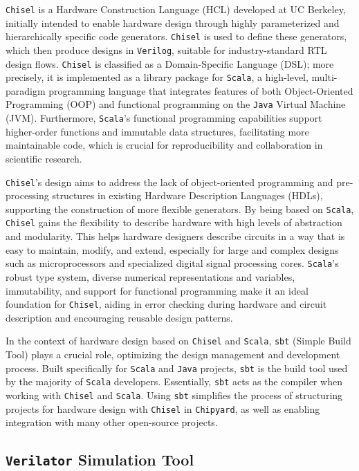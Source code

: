 \texttt{Chisel} is a Hardware Construction Language (HCL) developed at UC Berkeley, initially intended to enable hardware design through highly parameterized and hierarchically specific code generators. \texttt{Chisel} is used to define these generators, which then produce designs in \texttt{Verilog}, suitable for industry-standard RTL design flows. \texttt{Chisel} is classified as a Domain-Specific Language (DSL); more precisely, it is implemented as a library package for \texttt{Scala}, a high-level, multi-paradigm programming language that integrates features of both Object-Oriented Programming (OOP) and functional programming on the \texttt{Java} Virtual Machine (JVM). Furthermore, \texttt{Scala}'s functional programming capabilities support higher-order functions and immutable data structures, facilitating more maintainable code, which is crucial for reproducibility and collaboration in scientific research.

\texttt{Chisel}'s design aims to address the lack of object-oriented programming and pre-processing structures in existing Hardware Description Languages (HDLs), supporting the construction of more flexible generators. By being based on \texttt{Scala}, \texttt{Chisel} gains the flexibility to describe hardware with high levels of abstraction and modularity. This helps hardware designers describe circuits in a way that is easy to maintain, modify, and extend, especially for large and complex designs such as microprocessors and specialized digital signal processing cores. \texttt{Scala}'s robust type system, diverse numerical representations and variables, immutability, and support for functional programming make it an ideal foundation for \texttt{Chisel}, aiding in error checking during hardware and circuit description and encouraging reusable design patterns.

In the context of hardware design based on \texttt{Chisel} and \texttt{Scala}, \texttt{sbt} (Simple Build Tool) plays a crucial role, optimizing the design management and development process. Built specifically for \texttt{Scala} and \texttt{Java} projects, \texttt{sbt} is the build tool used by the majority of \texttt{Scala} developers. Essentially, \texttt{sbt} acts as the compiler when working with \texttt{Chisel} and \texttt{Scala}. Using \texttt{sbt} simplifies the process of structuring projects for hardware design with \texttt{Chisel} in \texttt{Chipyard}, as well as enabling integration with many other open-source projects.

\subsection{\texttt{Verilator} Simulation Tool}
\label{subsec:verilator}

